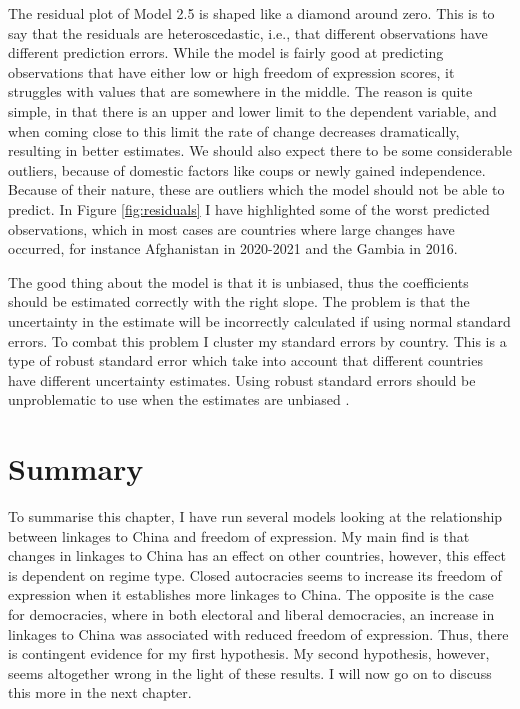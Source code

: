 The residual plot of Model 2.5 is shaped like a diamond around zero. This is to say that the residuals are heteroscedastic, i.e., that different observations have different prediction errors. While the model is fairly good at predicting observations that have either low or high freedom of expression scores, it struggles with values that are somewhere in the middle. The reason is quite simple, in that there is an upper and lower limit to the dependent variable, and when coming close to this limit the rate of change decreases dramatically, resulting in better estimates. We should also expect there to be some considerable outliers, because of domestic factors like coups or newly gained independence. Because of their nature, these are outliers which the model should not be able to predict. In Figure \ref{fig:residuals} I have highlighted some of the worst predicted observations, which in most cases are countries where large changes have occurred, for instance Afghanistan in 2020-2021 and the Gambia in 2016. 

The good thing about the model is that it is unbiased, thus the coefficients should be estimated correctly with the right slope. The problem is that the uncertainty in the estimate will be incorrectly calculated if using normal standard errors. To combat this problem I cluster my standard errors by country. This is a type of robust standard error which take into account that different countries have different uncertainty estimates. Using robust standard errors should be unproblematic to use when the estimates are unbiased \citep[p. 60]{wooldridge_econometric_2010}.

\section{Summary}
To summarise this chapter, I have run several models looking at the relationship between linkages to China and freedom of expression. My main find is that changes in linkages to China has an effect on other countries, however, this effect is dependent on regime type. Closed autocracies seems to increase its freedom of expression when it establishes more linkages to China. The opposite is the case for democracies, where in both electoral and liberal democracies, an increase in linkages to China was associated with reduced freedom of expression. Thus, there is contingent evidence for my first hypothesis. My second hypothesis, however, seems altogether wrong in the light of these results. I will now go on to discuss this more in the next chapter.